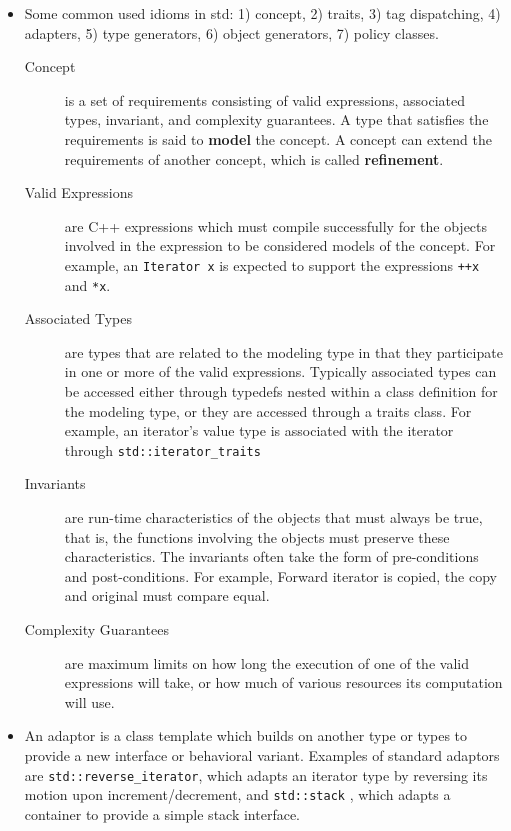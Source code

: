 \documentclass[a4paper,11pt,twoside]{book}
\begin{document}
\begin{itemize}
	\item Some common used idioms in std:
1) concept,
2) traits, 
3) tag dispatching,
4) adapters,
5) type generators,
6) object generators,
7) policy classes.

	
\begin{description}
	\item[Concept] is a set of requirements consisting of valid expressions, associated types, invariant, and complexity guarantees. A type that satisfies the requirements is said to \textbf{model} the concept. A concept can extend the requirements of another concept, which is called \textbf{refinement}.
	
	\item[Valid Expressions] are C++ expressions which must compile successfully for the objects involved in the expression to be considered models of the concept. For example, an \texttt{Iterator x} is expected to support the expressions \texttt{++x} and \texttt{*x}.
	
	\item[Associated Types] are types that are related to the modeling type in that they participate in one or more of the valid expressions. Typically associated types can be accessed either through typedefs nested within a class definition for the modeling type, or they are accessed through a traits class. For example, an iterator's value type is associated with the iterator through \texttt{std::iterator\_traits}
	
	\item[Invariants] are run-time characteristics of the objects that must always be true, that is, the functions involving the objects must preserve these characteristics. The invariants often take the form of pre-conditions and post-conditions. For example, Forward iterator is copied, the copy and original must compare equal.
	
	\item[Complexity Guarantees] are maximum limits on how long the execution of one of the valid expressions will take, or how much of various resources its computation will use.
\end{description}

	\item An adaptor is a class template which builds on another type or types to provide a new interface or behavioral variant. Examples of standard adaptors are \texttt{std::reverse\_iterator}, which adapts an iterator type by reversing its motion upon increment/decrement, and \texttt{std::stack} , which adapts a container to provide a simple stack interface.
	

\end{itemize}
\end{document}
